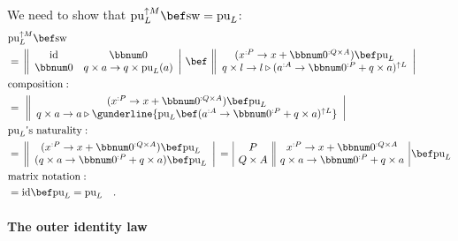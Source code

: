 We need to show that $\text{pu}_{L}^{\uparrow M}\bef\text{sw}=\text{pu}_{L}$:
\begin{align*}
 & \text{pu}_{L}^{\uparrow M}\bef\text{sw}\\
 & =\,\left\Vert \begin{array}{cc}
\text{id} & \bbnum 0\\
\bbnum 0 & q\times a\rightarrow q\times\text{pu}_{L}(a)
\end{array}\right|\,\bef\,\left\Vert \begin{array}{c}
(x^{:P}\rightarrow x+\bbnum 0^{:Q\times A})\bef\text{pu}_{L}\\
q\times l\rightarrow l\triangleright(a^{:A}\rightarrow\bbnum 0^{:P}+q\times a)^{\uparrow L}
\end{array}\right|\\
 & \text{composition}:\quad\\
 & =\,\,\left\Vert \begin{array}{c}
(x^{:P}\rightarrow x+\bbnum 0^{:Q\times A})\bef\text{pu}_{L}\\
q\times a\rightarrow a\triangleright\gunderline{\text{pu}_{L}\bef(a^{:A}\rightarrow\bbnum 0^{:P}+q\times a)^{\uparrow L}}
\end{array}\right|\\
 & \text{pu}_{L}\text{\textsf{'}s naturality}:\quad\\
 & =\,\left\Vert \begin{array}{c}
(x^{:P}\rightarrow x+\bbnum 0^{:Q\times A})\bef\text{pu}_{L}\\
(q\times a\rightarrow\bbnum 0^{:P}+q\times a)\bef\text{pu}_{L}
\end{array}\right|\,=\,\begin{array}{|c||c|}
P & x^{:P}\rightarrow x+\bbnum 0^{:Q\times A}\\
Q\times A & q\times a\rightarrow\bbnum 0^{:P}+q\times a
\end{array}\,\bef\text{pu}_{L}\\
 & \text{matrix notation}:\quad\\
 & =\text{id}\bef\text{pu}_{L}=\text{pu}_{L}\quad.
\end{align*}


\paragraph{The outer identity law}

